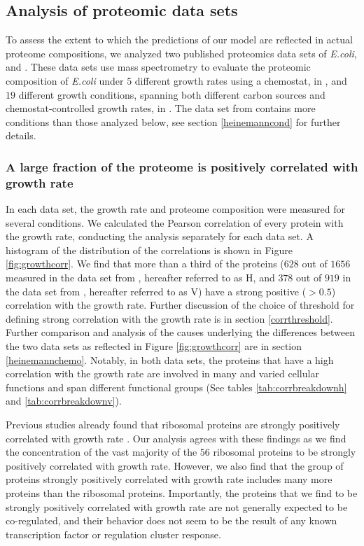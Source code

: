 \documentclass[a4paper]{article}
\begin{document}
\subsection{Analysis of proteomic data sets}
To assess the extent to which the predictions of our model are reflected in actual proteome compositions, we analyzed two published proteomics data sets of \emph{E.coli}, \cite{Valgepea2013} and \cite{Heinemann2015}.
These data sets use mass spectrometry to evaluate the proteomic composition of \emph{E.coli} under $5$ different growth rates using a chemostat, in \cite{Valgepea2013}, and $19$ different growth conditions, spanning both different carbon sources and chemostat-controlled growth rates, in \cite{Heinemann2015}.
The data set from \cite{Heinemann2015} contains more conditions than those analyzed below, see section \ref{heinemanncond} for further details.

\subsubsection{A large fraction of the proteome is positively correlated with growth rate}
In each data set, the growth rate and proteome composition were measured for several conditions.
We calculated the Pearson correlation of every protein with the growth rate, conducting the analysis separately for each data set.
A histogram of the distribution of the correlations is shown in Figure \ref{fig:growthcorr}.
We find that more than a third of the proteins ($628$ out of $1656$ measured in the data set from \cite{Heinemann2015}, hereafter referred to as H, and $378$ out of $919$ in the data set from \cite{Valgepea2013}, hereafter referred to as V) have a strong positive ($>0.5$) correlation with the growth rate.
Further discussion of the choice of threshold for defining strong correlation with the growth rate is in section \ref{corrthreshold}.
Further comparison and analysis of the causes underlying the differences between the two data sets as reflected in Figure \ref{fig:growthcorr} are in section \ref{heinemannchemo}.
Notably, in both data sets, the proteins that have a high correlation with the growth rate are involved in many and varied cellular functions and span different functional groups (See tables \ref{tab:corrbreakdownh} and \ref{tab:corrbreakdownv}).

Previous studies already found that ribosomal proteins are strongly positively correlated with growth rate \cite{Pedersen1978a, ingraham1983growth, Klumpp2008}.
Our analysis agrees with these findings as we find the concentration of the vast majority of the $56$ ribosomal proteins to be strongly positively correlated with growth rate.
However, we also find that the group of proteins strongly positively correlated with growth rate includes many more proteins than the ribosomal proteins.
Importantly, the proteins that we find to be strongly positively correlated with growth rate are not generally expected to be co-regulated, and their behavior does not seem to be the result of any known transcription factor or regulation cluster response.
\end{document}

